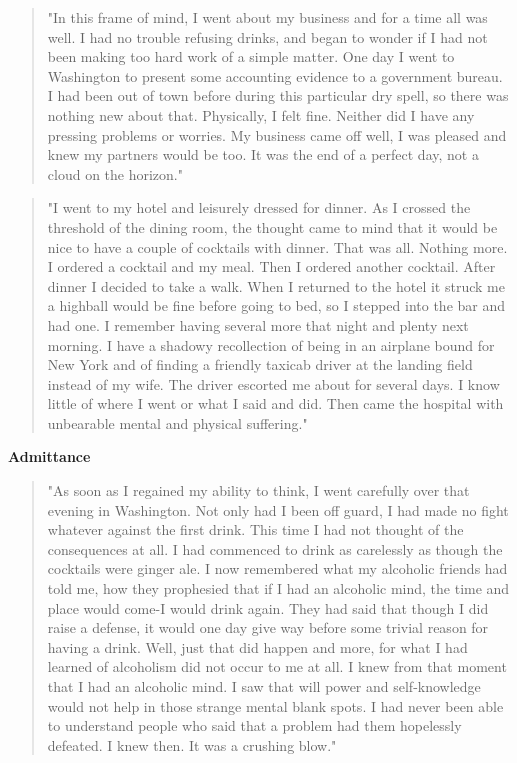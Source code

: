 \begin{quote}
"In this frame of mind, I went about my business and for a time all was well. 
I had no trouble refusing drinks, 
and began to wonder if I had not been making too hard work of a simple matter. 
One day I went to Washington to present some accounting evidence to a government bureau. 
I had been out of town before during this particular dry spell, 
so there was nothing new about that. 
Physically, I felt fine. 
Neither did I have any pressing problems or worries. 
My business came off well, I was pleased and knew my partners would be too. 
It was the end of a perfect day, not a cloud on the horizon."
\end{quote}


\begin{quote}
"I went to my hotel and leisurely dressed for dinner. 
As I crossed the threshold of the dining room, 
the thought came to mind that it would be nice to have a couple of cocktails with dinner. 
That was all. 
Nothing more. 
I ordered a cocktail and my meal. 
Then I ordered another cocktail. 
After dinner I decided to take a walk. 
When I returned to the hotel it struck me a highball would be fine before going to bed, 
so I stepped into the bar and had one. 
I remember having several more that night and plenty next morning. 
I have a shadowy recollection of being in an airplane bound for New York 
and of finding a friendly taxicab driver at the landing field instead of my wife. 
The driver escorted me about for several days. 
I know little of where I went or what I said and did. 
Then came the hospital with unbearable mental and physical suffering."
\end{quote}


\textbf{Admittance}

\begin{quote}
"As soon as I regained my ability to think, I went carefully over that evening in Washington. 
Not only had I been off guard, I had made no fight whatever against the first drink. 
This time I had not thought of the consequences at all. 
I had commenced to drink as carelessly as though the cocktails were ginger ale. 
I now remembered what my alcoholic friends had told me, 
how they prophesied that if I had an alcoholic mind, 
the time and place would come-I would drink again. 
They had said that though I did raise a defense, 
it would one day give way before some trivial reason for having a drink. 
Well, just that did happen and more, 
for what I had learned of alcoholism did not occur to me at all. 
I knew from that moment that I had an alcoholic mind. 
I saw that will power and self-knowledge would not help in those strange mental blank spots. 
I had never been able to understand people who said that a problem had them hopelessly defeated. 
I knew then. 
It was a crushing blow."
\end{quote}

